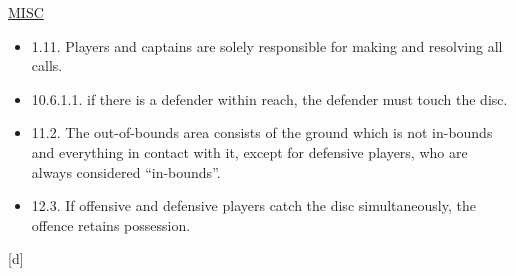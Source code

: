 \underline{\uppercase{Misc}}

\begin{itemize}
    \tiny
    \item 1.11. Players and captains are solely responsible for making and resolving all calls.
    \item 10.6.1.1. if there is a defender within reach, the defender must touch the disc.
    \item 11.2. The out-of-bounds area consists of the ground which is not in-bounds and everything in contact with it, except for defensive players, who are always considered “in-bounds”.
    \item 12.3. If offensive and defensive players catch the disc simultaneously, the offence retains possession.
\end{itemize}

\begin{center}[d]\end{center}

